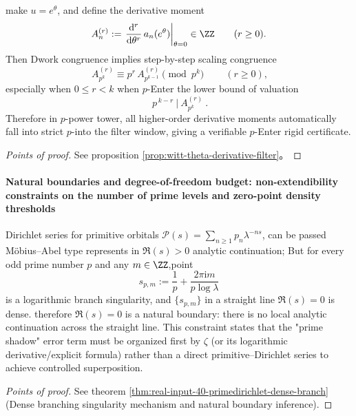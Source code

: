 \begin{conclusion}\label{con:xi-theta-derivative-padic-filter}
make \(u=e^\theta\), and define the derivative moment
\[
A_{n}^{(r)}:=\left.\frac{\mathrm{d}^r}{\mathrm{d}\theta^r}\,a_n(e^\theta)\right|_{\theta=0}\in\ZZ\qquad(r\ge 0).
\]
Then Dwork congruence implies step-by-step scaling congruence
\[
\boxed{\ A_{p^k}^{(r)}\equiv p^r\,A_{p^{k-1}}^{(r)}\pmod{p^k}\ }\qquad(r\ge 0),
\]
especially when \(0\le r<k\) when \(p\)-Enter the lower bound of valuation
\[
\boxed{\ p^{\,k-r}\ \big|\ A_{p^k}^{(r)}\ }.
\]
Therefore in \(p\)-power tower, all higher-order derivative moments automatically fall into strict \(p\)-into the filter window, giving a verifiable \(p\)-Enter rigid certificate.
\end{conclusion}
\begin{proof}[Points of proof]
See proposition \ref{prop:witt-theta-derivative-filter}。
\end{proof}

\paragraph{Natural boundaries and degree-of-freedom budget: non-extendibility constraints on the number of prime levels and zero-point density thresholds}

\begin{conclusion}[primitive--natural boundary of Dirichlet series:\texorpdfstring{$\Re(s)=0$}{Re(s)=0} Upper dense branch singularity enforces non-extendibility]\label{con:xi-primedirichlet-natural-boundary}
Dirichlet series for primitive orbitals \(\mathcal{P}(s)=\sum_{n\ge 1}p_n\lambda^{-ns}\), can be passed M\"obius--Abel type represents in \(\Re(s)>0\) analytic continuation;
But for every odd prime number \(p\) and any \(m\in\ZZ\),point
\[
s_{p,m}:=\frac{1}{p}+\frac{2\pi \mathrm{i} m}{p\log\lambda}
\]
is a logarithmic branch singularity, and \(\{s_{p,m}\}\) in a straight line \(\Re(s)=0\) is dense.
therefore \(\Re(s)=0\) is a natural boundary: there is no local analytic continuation across the straight line.
This constraint states that the "prime shadow" error term must be organized first by \(\zeta\) (or its logarithmic derivative/explicit formula) rather than a direct primitive--Dirichlet series to achieve controlled superposition.
\end{conclusion}
\begin{proof}[Points of proof]
See theorem \ref{thm:real-input-40-primedirichlet-dense-branch}(Dense branching singularity mechanism and natural boundary inference).
\end{proof}

